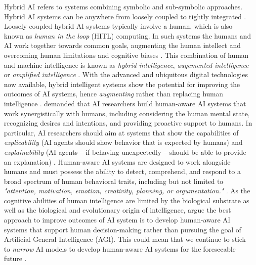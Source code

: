 Hybrid AI refers to systems combining symbolic and sub-symbolic
approaches. Hybrid AI systems can be anywhere from loosely coupled to tightly integrated \citep{garcezNeurosymbolicAI3rd2023}.
Loosely coupled hybrid AI systems typically involve a human, which is also known as \textit{human in the loop} (HITL)
computing. In such systems the humans and AI work together towards common goals, augmenting the human intellect and
overcoming human limitations and cognitive biases \citep{akataResearchAgendaHybrid2020}. This combination of human and machine
intelligence is known as \textit{hybrid intelligence}, \textit{augemented intelligence} or \textit{amplified intelligence}
\citep{schmidtAugmentingHumanIntellect2017,akataResearchAgendaHybrid2020,zhouIntelligenceAugmentationBuilding2021}.
With the advanced and ubiquitous digital technologies now available, hybrid intelligent systems show the potential for improving
the outcomes of AI systems,  hence \textit{augmenting} rather than replacing human intelligence \citep{schmidtAugmentingHumanIntellect2017,
akataResearchAgendaHybrid2020}. \cite{kambhampatiChallengesHumanAwareAI2020} demanded that AI researchers build human-aware AI
systems that work synergistically with humans, including considering the human mental state, recognizing desires and intentions,
and providing proactive support to humans. In particular, AI researchers should aim at systems that show the capabilities of
\textit{explicability} (AI agents should show behavior that is expected by humans) and \textit{explainability} (AI agents -- 
if behaving unexpectedly -- should be able to provide an explanation) \citep{kambhampatiChallengesHumanAwareAI2020}.
Human-aware AI systems are designed to work alongside humans and must possess the ability to detect, comprehend, and respond
to a broad spectrum of human behavioral traits, including but not limited to \textit{"attention, motivation, emotion, creativity,
planning, or argumentation."} \citep{kortelingHumanArtificialIntelligence2021}. As the cognitive abilities of human intelligence
are limited by the biological substrate as well as the biological and evolutionary origin of intelligence,
\cite{kortelingHumanArtificialIntelligence2021} argue the best approach to improve outcomes of AI system is to develop
human-aware AI systems that support human decision-making rather than pursuing the goal of Artificial General Intelligence (AGI).
This could mean that we continue to stick to \textit{narrow} AI models to develop human-aware AI systems for the foreseeable
future \citep{kortelingHumanArtificialIntelligence2021}.



